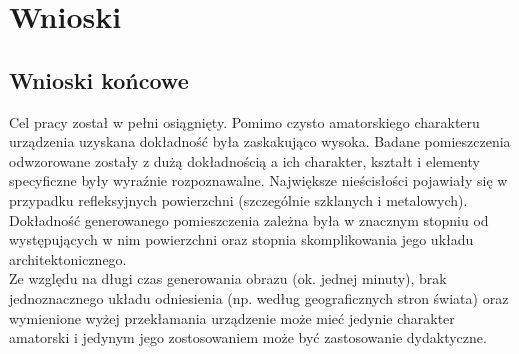\section {Wnioski}
\subsection {Wnioski końcowe}
Cel pracy został w pełni osiągnięty. Pomimo czysto amatorskiego charakteru urządzenia uzyskana dokładność była zaskakująco wysoka. Badane pomieszczenia odwzorowane zostały z dużą dokładnością a ich charakter, kształt i elementy specyficzne  były wyraźnie rozpoznawalne. Największe nieścisłości pojawiały się w przypadku refleksyjnych powierzchni (szczególnie szklanych i metalowych).\\

Dokładność generowanego pomieszczenia zależna była w znacznym stopniu od występujących w nim powierzchni oraz stopnia skomplikowania jego układu architektonicznego.\\

Ze względu na długi czas generowania obrazu (ok. jednej minuty), brak jednoznacznego układu odniesienia (np. według geograficznych stron świata) oraz wymienione wyżej przekłamania urządzenie może mieć jedynie charakter amatorski i jedynym jego zostosowaniem może być zastosowanie dydaktyczne.